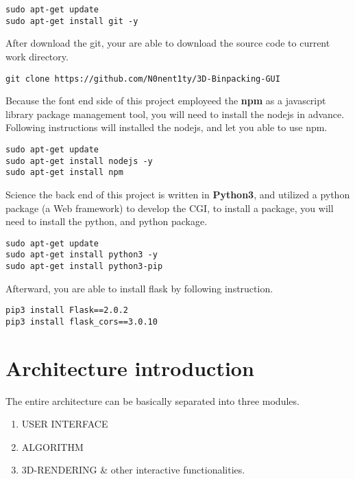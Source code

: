 \documentclass{article}
\begin{document}
\begin{mdframed}[backgroundcolor=bg]
\begin{verbatim}
sudo apt-get update
sudo apt-get install git -y
\end{verbatim}
\end{mdframed}

\noindent After download the git, your are able to download the source code to current work directory.
\begin{mdframed}[backgroundcolor=bg]
\begin{verbatim}
git clone https://github.com/N0nent1ty/3D-Binpacking-GUI
\end{verbatim}
\end{mdframed}

\noindent Because the font end side of this project employeed the \textbf{npm} as a javascript library package management tool, you will need to install the nodejs in advance.
Following instructions will installed the nodejs, and let you able to use npm.

\begin{mdframed}[backgroundcolor=bg]
\begin{verbatim}
sudo apt-get update
sudo apt-get install nodejs -y
sudo apt-get install npm
\end{verbatim}
\end{mdframed}

Science the back end of this project is written in \textbf{Python3}, and utilized a python package (a Web framework) to develop the CGI, to install a package, you will need to install the python, and python package.

\begin{mdframed}[backgroundcolor=bg]
\begin{verbatim}
sudo apt-get update
sudo apt-get install python3 -y
sudo apt-get install python3-pip
\end{verbatim}
\end{mdframed}

\noindent Afterward, you are able to install flask by following instruction.
\begin{mdframed}[backgroundcolor=bg]
\begin{verbatim}
pip3 install Flask==2.0.2
pip3 install flask_cors==3.0.10
\end{verbatim}
\end{mdframed}


\section{Architecture introduction}
The entire architecture can be basically separated into three modules.\newline
\begin{enumerate}
\item USER INTERFACE
\item ALGORITHM
\item 3D-RENDERING \& other interactive functionalities.
\end{enumerate}
\end{document}
